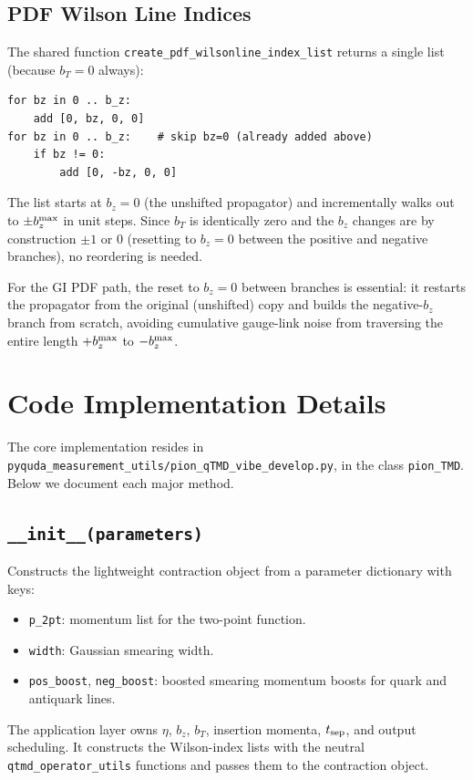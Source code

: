 \documentclass[11pt,a4paper]{article}
\begin{document}
\subsection{PDF Wilson Line Indices}

The shared function \verb|create_pdf_wilsonline_index_list| returns a single
list (because $b_T = 0$ always):
\begin{verbatim}
for bz in 0 .. b_z:
    add [0, bz, 0, 0]
for bz in 0 .. b_z:    # skip bz=0 (already added above)
    if bz != 0:
        add [0, -bz, 0, 0]
\end{verbatim}
The list starts at $b_z=0$ (the unshifted propagator) and incrementally walks
out to $\pm b_z^{\rm max}$ in unit steps.  Since $b_T$ is identically zero and
the $b_z$ changes are by construction $\pm 1$ or $0$ (resetting to $b_z=0$
between the positive and negative branches), no reordering is needed.

For the GI PDF path, the reset to $b_z=0$ between branches is essential: it
restarts the propagator from the original (unshifted) copy and builds the
negative-$b_z$ branch from scratch, avoiding cumulative gauge-link noise from
traversing the entire length $+b_z^{\rm max}$ to $-b_z^{\rm max}$.

\section{Code Implementation Details}
\label{sec:code}

The core implementation resides in
\verb|pyquda_measurement_utils/pion_qTMD_vibe_develop.py|, in the class
\verb|pion_TMD|.  Below we document each major method.

\subsection{\texttt{\_\_init\_\_(parameters)}}

Constructs the lightweight contraction object from a parameter dictionary
with keys:
\begin{itemize}[nosep]
  \item \texttt{p\_2pt}: momentum list for the two-point function.
  \item \texttt{width}: Gaussian smearing width.
  \item \texttt{pos\_boost}, \texttt{neg\_boost}: boosted smearing momentum
        boosts for quark and antiquark lines.
\end{itemize}
The application layer owns $\eta$, $b_z$, $b_T$, insertion momenta,
$t_{\rm sep}$, and output scheduling.  It constructs the Wilson-index lists
with the neutral \verb|qtmd_operator_utils| functions and passes them to the
contraction object.
\end{document}
